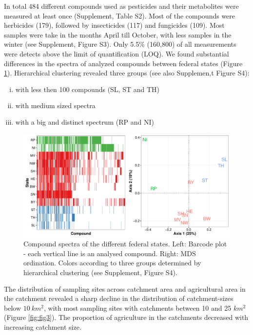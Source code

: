 \documentclass[journal=esthag,manuscript=article]{achemso}
\begin{document}
In total 484 different compounds used as pesticides and their metabolites were measured at least once (Supplement, Table S2). 
Most of the compounds were herbicides (179), followed by insecticides (117) and fungicides (109).
Most samples were take in the months April till October, with less samples in the winter (see Supplement, Figure S3).
Only 5.5\% (160,800) of all measurements were detects above the limit of quantification (LOQ).
We found substantial differences in the spectra of analyzed compounds between federal states (Figure \ref{fig:fig2}).
Hierarchical clustering revealed three groups (see also Supplemen,t Figure S4):

\begin{enumerate}[i)]
	\item with less then 100 compounds (SL, ST and TH)
	\item with medium sized spectra
	\item with a big and distinct spectrum (RP and NI)
\end{enumerate}

\begin{figure}[ht]
  \includegraphics[width=\textwidth]{figure2.pdf}
  \caption{Compound spectra of the different federal states. Left: Barcode plot - each vertical line is an analysed compound. Right: MDS ordination. 
  Colors according to three groups determined by hierarchical clustering (see Supplement, Figure S4).}
  \label{fig:fig2}
\end{figure}

The distribution of sampling sites across catchment area and agricultural area in the catchment revealed a sharp decline in the distribution of catchment-sizes below $10~km^2$, with most sampling sites with catchments between 10 and 25 $km^2$ (Figure \ref{fig:fig3}).
The proportion of agriculture in the catchments decreased with increasing catchment size.
\end{document}
